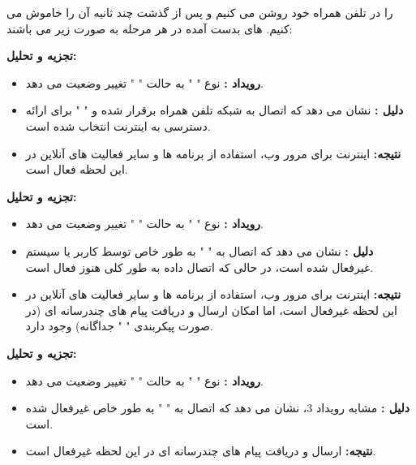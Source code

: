 \documentclass{report}
\begin{document}
را در تلفن همراه خود روشن می کنیم و پس از گذشت چند ثانیه آن را خاموش می کنیم. 
های بدست آمده در هر مرحله به صورت زیر می باشند:
\begin{latin}
	
	\label{code:state2}
\end{latin}
\textbf{تجزیه و تحلیل:}
\begin{itemize}
	\item
	\textbf{رویداد
		: }
	نوع "
	" به حالت "
	" تغییر وضعیت می دهد.
	\item
	\textbf{دلیل
		:}
	نشان می دهد که اتصال به شبکه تلفن همراه برقرار شده و
	 "
	" برای ارائه دسترسی به اینترنت انتخاب شده است.
	\item
	\textbf{نتیجه:}
	اینترنت برای مرور وب، استفاده از برنامه ها و سایر فعالیت های آنلاین در این لحظه فعال است.
\end{itemize}
\begin{latin}
	
	\label{code:state3}
\end{latin}
\textbf{تجزیه و تحلیل:}
\begin{itemize}
	\item
	\textbf{رویداد
		: }
	نوع "
	" به حالت "
	" تغییر وضعیت می دهد.
	\item
	\textbf{دلیل
		:}
	نشان می دهد که اتصال به 
	 "
	 "
	 به طور خاص توسط کاربر یا سیستم غیرفعال شده است، در حالی که اتصال داده به طور کلی هنوز فعال است.
	\item
	\textbf{نتیجه:}
	اینترنت برای مرور وب، استفاده از برنامه ها و سایر فعالیت های آنلاین در این لحظه غیرفعال است، اما امکان ارسال و دریافت پیام های چندرسانه ای (در صورت پیکربندی 
	 "
	" جداگانه) وجود دارد.
\end{itemize}
\begin{latin}
	
	\label{code:state4}
\end{latin}
\textbf{تجزیه و تحلیل:}
\begin{itemize}
	\item
	\textbf{رویداد
		: }
	نوع "
	" به حالت "
	" تغییر وضعیت می دهد.
	\item
	\textbf{دلیل
		:}
	مشابه رویداد 3، نشان می دهد که اتصال به 
	 "
	 " به طور خاص غیرفعال شده است.
	\item
	\textbf{نتیجه:}
	ارسال و دریافت پیام های چندرسانه ای در این لحظه غیرفعال است.
\end{itemize}
\end{document}
